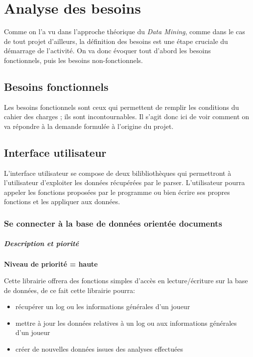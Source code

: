 \chapter{Analyse des besoins}


Comme on l'a vu dans l'approche théorique du \textit{Data Mining}, comme dans le cas de tout projet d'ailleurs, la définition des besoins est une étape cruciale du démarrage de l'activité. On va donc évoquer tout d'abord les besoins fonctionnels, puis les besoins non-fonctionnels.


\section{Besoins fonctionnels} 
Les besoins fonctionnels sont ceux qui permettent de remplir les conditions du cahier des charges ; ils sont incontournables. Il s'agit donc ici de voir comment on va répondre à la demande formulée à l'origine du projet.

\section{Interface utilisateur}
L'interface utilisateur se compose de deux bilibliothèques qui permettront à l'utilisateur d'exploiter les données récupérées par le parser. L'utilisateur pourra appeler les fonctions proposées par le programme ou bien écrire ses propres fonctions et les appliquer aux données.

\subsection{Se connecter à la base de données orientée documents}

\paragraph*{Description et piorité}

\textbf{Niveau de priorité = haute}

Cette librairie offrera des fonctions simples d'accès en lecture/écriture sur la base de données, de ce fait cette librairie pourra:
\begin{itemize}
\item récupérer un log ou les informations générales d'un joueur
\item mettre à jour les données relatives à un log ou aux informations générales d'un joueur
\item créer de nouvelles données issues des analyses effectuées
\end{itemize}

